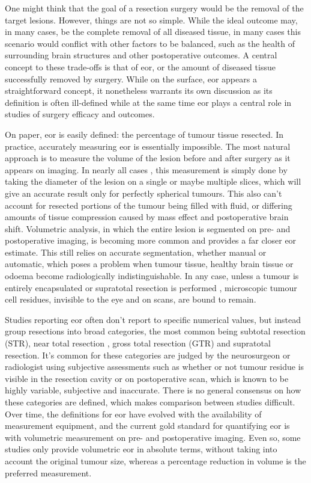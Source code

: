 One might think that the goal of a resection surgery would be the removal of the target lesions.
However, things are not so simple.
While the ideal outcome may, in many cases, be the complete removal of all diseased tissue, in many cases this scenario would conflict with other factors to be balanced, such as the health of surrounding brain structures and other postoperative outcomes.
A central concept to these trade-offs is that of \gls{eor}, or the amount of diseased tissue  successfully removed by surgery.
While on the surface, \gls{eor} appears a straightforward concept, it nonetheless warrants its own discussion as its definition is often ill-defined while at the same time \gls{eor} plays a central role in studies of surgery efficacy and outcomes.

On paper, \gls{eor} is easily defined: the percentage of tumour tissue resected.
In practice, accurately measuring \gls{eor} is essentially impossible.
The most natural approach is to measure the volume of the lesion before and after surgery as it appears on imaging.
In nearly all cases , this measurement is simply done by taking the diameter of the lesion on a single or maybe multiple slices, which will give an accurate result only for perfectly spherical tumours.
This also can't account for resected portions of the tumour being filled with fluid, or differing amounts of tissue compression caused by mass effect and postoperative brain shift.
Volumetric analysis, in which the entire lesion is segmented on pre- and postoperative imaging, is becoming more common and provides a far closer \gls{eor} estimate.
This still relies on accurate segmentation, whether manual or automatic, which poses a problem when tumour tissue, healthy brain tissue or odoema become radiologically indistinguishable.
In any case, unless a tumour is entirely encapsulated  or supratotal resection is performed , microscopic tumour cell residues, invisible to the eye and on scans, are bound to remain.

Studies reporting \gls{eor} often don't report to specific numerical values, but instead group resections into broad categories, the most common being subtotal resection (STR), near total resection , gross total resection (GTR) and supratotal resection.
It's common for these categories are judged by the neurosurgeon or radiologist using subjective assessments such as whether or not tumour residue is visible in the resection cavity or on postoperative scan, which is known to be highly variable, subjective and inaccurate.\autocite{Sezer2020,Lau2018}
There is no general consensus on how these categories are defined, which makes comparison between studies difficult.
Over time, the definitions for \gls{eor} have evolved with the availability of measurement equipment, and the current gold standard for quantifying \gls{eor} is with volumetric measurement on pre- and postoperative imaging.\autocite{Rincon-Torroella2019}
Even so, some studies only provide volumetric \gls{eor} in absolute terms, without taking into account the original tumour size, whereas a percentage reduction in volume is the preferred measurement.\autocite{Ius2020,Rincon-Torroella2019,Smith2008} 

